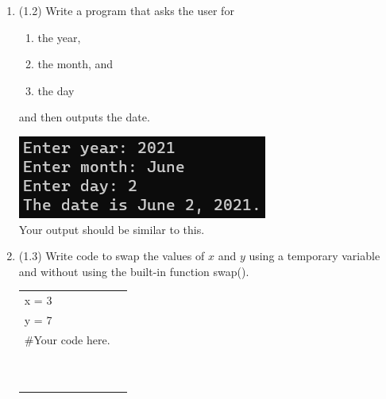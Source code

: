 \documentclass{article}
\begin{document}
\begin{enumerate}
\item (1.2) Write a program that asks the user for \\
		\begin{minipage}{0.5\textwidth}	
		\vspace*{-0.5em}
			\begin{enumerate}  \setlength\itemsep{-0.3em}
				\item the year,
				\item the month, and
				\item the day	
			\end{enumerate} \vspace*{-1ex}
		and then outputs the date.
		\end{minipage}
		\begin{minipage}{0.5\textwidth}
			\centering
			\includegraphics[scale=0.75]{./imgs/dateOutput.png}\\
			Your output should be similar to this.
		\end{minipage}

	

\item (1.3) 
		Write code to swap the values of $x$ and $y$ using a temporary variable and without using
		the built-in function swap().\\		
		\begin{tabular}{|ll}
			\\			
			x = 3\\
			y = 7\\[5pt]
			\#Your code here. \\[5pt]
			& \\ & \\ & \\ & \\ & \\ & \\ & \\ & \\ & \\ & \\ 
		\end{tabular}




\end{enumerate}
\end{document}
